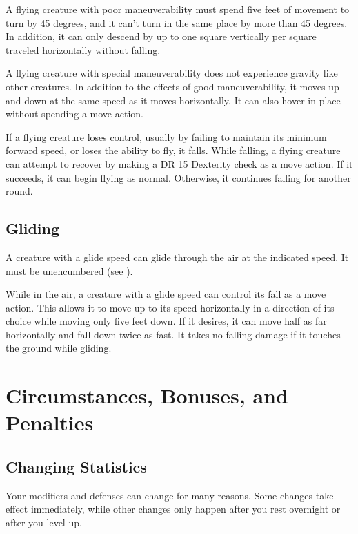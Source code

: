              A flying creature with poor maneuverability must spend five feet of movement to turn by 45 degrees, and it can't turn in the same place by more than 45 degrees. In addition, it can only descend by up to one square vertically per square traveled horizontally without falling.

             A flying creature with special maneuverability does not experience gravity like other creatures. In addition to the effects of good maneuverability, it moves up and down at the same speed as it moves horizontally. It can also hover in place without spending a move action.

             If a flying creature loses control, usually by failing to maintain its minimum forward speed, or loses the ability to fly, it falls. While falling, a flying creature can attempt to recover by making a DR 15 Dexterity check as a move action. If it succeeds, it can begin flying as normal. Otherwise, it continues falling for another round.

    \subsection{Gliding}\label{Gliding}
        A creature with a glide speed can glide through the air at the indicated speed. It must be unencumbered (see ).

        While in the air, a creature with a glide speed can control its fall as a move action. This allows it to move up to its speed horizontally in a direction of its choice while moving only five feet down. If it desires, it can move half as far horizontally and fall down twice as fast. It takes no falling damage if it touches the ground while gliding.

\section{Circumstances, Bonuses, and Penalties}\label{Circumstances, Bonuses, and Penalties}

    \subsection{Changing Statistics}

        Your modifiers and defenses can change for many reasons.
        Some changes take effect immediately, while other changes only happen after you rest overnight or after you level up.


